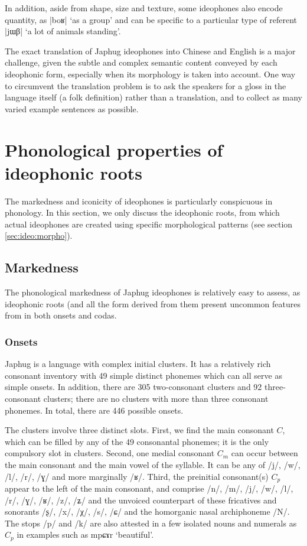 \documentclass[oldfontcommands,oneside,a4paper,11pt]{article}
\newcommand{\ipa}[1]{{\phon \mbox{#1}}} %
\begin{document}
  
  In addition, aside from shape, size and texture, some ideophones also encode quantity, as |\ipa{boʁ}| `as a group' and can be specific to a particular type of referent |\ipa{jɯβ}| `a lot of animals standing'.
  
  The exact translation of Japhug ideophones into Chinese and English is a major challenge, given the subtle and complex semantic content conveyed by each ideophonic form, especially when its morphology is taken into account. One way to circumvent the translation problem is to ask the speakers for a gloss in the language itself (a folk definition) rather than a translation, and to collect as many varied example sentences as possible.
  
  \section{Phonological properties of ideophonic roots}
The markedness and iconicity of ideophones is particularly conspicuous in phonology. In this section, we only discuss the ideophonic roots, from which actual ideophones are created using specific morphological patterns (see section \ref{sec:ideo:morpho}).
 
 \subsection{Markedness}
 The phonological markedness of Japhug ideophones is relatively easy to assess, as ideophonic roots (and all the form derived from them present uncommon features from in both onsets and codas.
 \subsubsection{Onsets}
 Japhug is a language with complex initial clusters. It has a relatively rich consonant inventory with 49 simple distinct phonemes which can all serve as simple onsets. In addition, there are 305   two-consonant  clusters and 92  three-consonant clusters; there are no clusters with more than three consonant phonemes. In total, there are  446 possible onsets.
 
The clusters involve three distinct slots. First, we find the main consonant $C$, which can be filled by any of the 49 consonantal phonemes; it is the only compulsory slot in clusters. Second,  one medial consonant $C_m$  can occur between the main consonant and the main vowel of the syllable. It can be any of /\ipa{j}/, /\ipa{w}/, /\ipa{l}/, /\ipa{r}/, /\ipa{ɣ}/ and more marginally /\ipa{ʁ}/. Third, the preinitial consonant(s) $C_p$ appear to the left of the main consonant, and comprise /\ipa{n}/, /\ipa{m}/,   /\ipa{j}/, /\ipa{w}/, /\ipa{l}/, /\ipa{r}/, /\ipa{ɣ}/,   /\ipa{ʁ}/, /\ipa{z}/, /\ipa{ʑ}/ and the unvoiced counterpart of these fricatives and sonorants /\ipa{ʂ}/, /\ipa{x}/,   /\ipa{χ}/, /\ipa{s}/, /\ipa{ɕ}/ and  the homorganic nasal archiphoneme /N/. The stops /\ipa{p}/ and /\ipa{k}/ are also attested in a few isolated nouns and numerals as $C_p$ in examples such as \ipa{mpɕɤr} `beautiful'.
\end{document}
